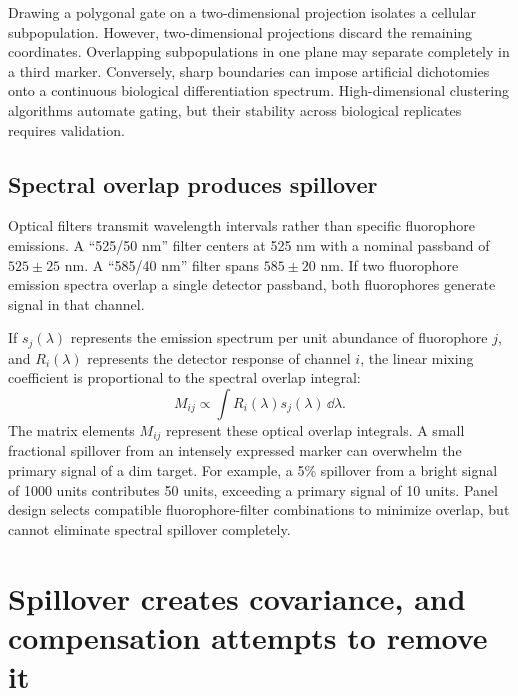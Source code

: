 Drawing a polygonal gate on a two-dimensional projection isolates a cellular subpopulation. However, two-dimensional projections discard the remaining coordinates. Overlapping subpopulations in one plane may separate completely in a third marker. Conversely, sharp boundaries can impose artificial dichotomies onto a continuous biological differentiation spectrum. High-dimensional clustering algorithms automate gating, but their stability across biological replicates requires validation.

\subsection{Spectral overlap produces spillover}
\label{subsec:l05-spectra}
Optical filters transmit wavelength intervals rather than specific fluorophore emissions. A ``525/50 nm'' filter centers at 525 nm with a nominal passband of $525\pm25$ nm. A ``585/40 nm'' filter spans $585\pm20$ nm. If two fluorophore emission spectra overlap a single detector passband, both fluorophores generate signal in that channel.

If $s_j(\lambda)$ represents the emission spectrum per unit abundance of fluorophore $j$, and $R_i(\lambda)$ represents the detector response of channel $i$, the linear mixing coefficient is proportional to the spectral overlap integral:
\begin{equation}
M_{ij}\propto\int R_i(\lambda)s_j(\lambda)\,\dd\lambda.
\label{eq:l05-spectral-integral}
\end{equation}
The matrix elements $M_{ij}$ represent these optical overlap integrals. A small fractional spillover from an intensely expressed marker can overwhelm the primary signal of a dim target. For example, a 5\% spillover from a bright signal of 1000 units contributes 50 units, exceeding a primary signal of 10 units. Panel design selects compatible fluorophore-filter combinations to minimize overlap, but cannot eliminate spectral spillover completely.

\section{Spillover creates covariance, and compensation attempts to remove it}
\label{sec:l05-compensation}
